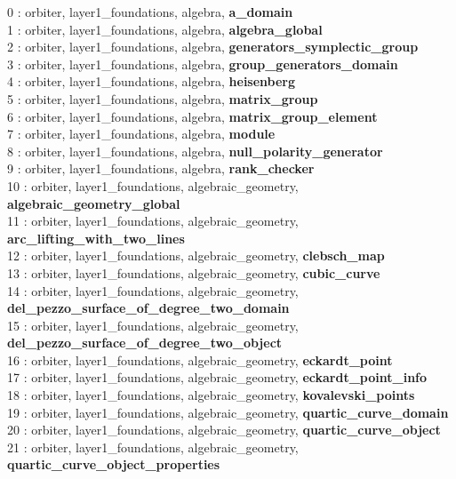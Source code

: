   0 : orbiter, layer1\_foundations, algebra, {\bf a\_domain}\\
  1 : orbiter, layer1\_foundations, algebra, {\bf algebra\_global}\\
  2 : orbiter, layer1\_foundations, algebra, {\bf generators\_symplectic\_group}\\
  3 : orbiter, layer1\_foundations, algebra, {\bf group\_generators\_domain}\\
  4 : orbiter, layer1\_foundations, algebra, {\bf heisenberg}\\
  5 : orbiter, layer1\_foundations, algebra, {\bf matrix\_group}\\
  6 : orbiter, layer1\_foundations, algebra, {\bf matrix\_group\_element}\\
  7 : orbiter, layer1\_foundations, algebra, {\bf module}\\
  8 : orbiter, layer1\_foundations, algebra, {\bf null\_polarity\_generator}\\
  9 : orbiter, layer1\_foundations, algebra, {\bf rank\_checker}\\
 10 : orbiter, layer1\_foundations, algebraic\_geometry, {\bf algebraic\_geometry\_global}\\
 11 : orbiter, layer1\_foundations, algebraic\_geometry, {\bf arc\_lifting\_with\_two\_lines}\\
 12 : orbiter, layer1\_foundations, algebraic\_geometry, {\bf clebsch\_map}\\
 13 : orbiter, layer1\_foundations, algebraic\_geometry, {\bf cubic\_curve}\\
 14 : orbiter, layer1\_foundations, algebraic\_geometry, {\bf del\_pezzo\_surface\_of\_degree\_two\_domain}\\
 15 : orbiter, layer1\_foundations, algebraic\_geometry, {\bf del\_pezzo\_surface\_of\_degree\_two\_object}\\
 16 : orbiter, layer1\_foundations, algebraic\_geometry, {\bf eckardt\_point}\\
 17 : orbiter, layer1\_foundations, algebraic\_geometry, {\bf eckardt\_point\_info}\\
 18 : orbiter, layer1\_foundations, algebraic\_geometry, {\bf kovalevski\_points}\\
 19 : orbiter, layer1\_foundations, algebraic\_geometry, {\bf quartic\_curve\_domain}\\
 20 : orbiter, layer1\_foundations, algebraic\_geometry, {\bf quartic\_curve\_object}\\
 21 : orbiter, layer1\_foundations, algebraic\_geometry, {\bf quartic\_curve\_object\_properties}\\

